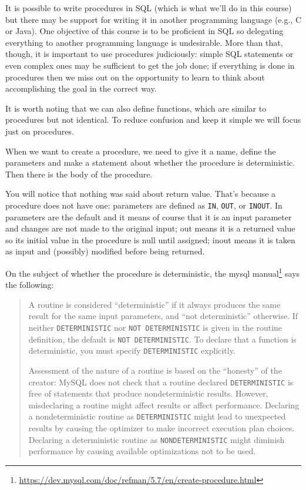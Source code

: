 \documentclass[a4paper]{report}
\begin{document}
It is possible to write procedures in SQL (which is what we'll do in this course) but there may be support for writing it in another programming language (e.g., C or Java). One objective of this course is to be proficient in SQL so delegating everything to another programming language is undesirable. More than that, though, it is important to use procedures judiciously: simple SQL statements or even complex ones may be sufficient to get the job done; if everything is done in procedures then we miss out on the opportunity to learn to think about accomplishing the goal in the correct way. 

It is worth noting that we can also define functions, which are similar to procedures but not identical. To reduce confusion and keep it simple we will focus just on procedures. 

When we want to create a procedure, we need to give it a name, define the parameters and make a statement about whether the procedure is deterministic. Then there is the body of the procedure.

You will notice that nothing was said about return value. That's because a procedure does not have one: parameters are defined as \texttt{IN}, \texttt{OUT}, or \texttt{INOUT}. In parameters are the default and it means of course that it is an input parameter and changes are not made to the original input; out means it is a returned value so its initial value in the procedure is null until assigned; inout means it is taken as input and (possibly) modified before being returned.

On the subject of whether the procedure is deterministic, the mysql manual\footnote{\url{https://dev.mysql.com/doc/refman/5.7/en/create-procedure.html}} says the following:

\begin{quote}
A routine is considered ``deterministic'' if it always produces the same result for the same input parameters, and ``not deterministic'' otherwise. If neither \texttt{DETERMINISTIC} nor \texttt{NOT DETERMINISTIC} is given in the routine definition, the default is \texttt{NOT DETERMINISTIC}. To declare that a function is deterministic, you must specify \texttt{DETERMINISTIC} explicitly.

Assessment of the nature of a routine is based on the ``honesty'' of the creator: MySQL does not check that a routine declared \texttt{DETERMINISTIC} is free of statements that produce nondeterministic results. However, misdeclaring a routine might affect results or affect performance. Declaring a nondeterministic routine as \texttt{DETERMINISTIC} might lead to unexpected results by causing the optimizer to make incorrect execution plan choices. Declaring a deterministic routine as \texttt{NONDETERMINISTIC} might diminish performance by causing available optimizations not to be used.
\end{quote}
\end{document}
